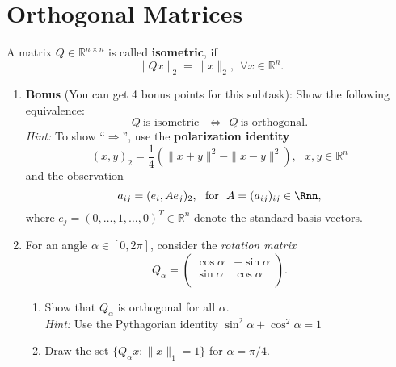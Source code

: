 \section{Orthogonal Matrices}

A matrix $Q\in\mathbb{R}^{n\times n}$ is called \textbf{isometric}, if 
$$\|Qx\|_2=\|x\|_2,  ~~\forall x\in\mathbb{R}^n.$$

\begin{enumerate}
	\item \textbf{Bonus} (You can get 4 bonus points for this subtask): Show the following equivalence:
	$$ Q   ~\text{is isometric}~~~ \Leftrightarrow~~Q~ \text{is orthogonal}.$$
	\textit{Hint:} To show ``$\Rightarrow$'', use the {\color{navy}\textbf{polarization identity}
	 $$(x,y)_2 = \frac{1}{4}\left(\|x+y\|^2 - \|x-y\|^2\right),~~~x,y \in \mathbb{R}^n $$}and the observation 
 		$$a_{ij} = (e_i, Ae_j)_2,~~ \text{for}~~A=(a_{ij})_{ij}\in\Rnn,$$
 		where $e_j=(0,\ldots, 1, \ldots, 0)^T \in \mathbb{R}^n$ denote the standard basis vectors.
	\item For an angle $\alpha \in [0,2\pi]$, consider the \textit{rotation matrix}
	$$Q_\alpha = \begin{pmatrix}
	\cos \alpha & -\sin \alpha\\
	\sin \alpha & \cos \alpha\\
	\end{pmatrix}.
	$$
	\begin{enumerate}
		\item Show that $Q_\alpha$ is orthogonal for all $\alpha$. \\
		\textit{Hint:} Use the Pythagorian identity $\sin^2\alpha + \cos^2\alpha = 1$
		\item Draw the set $\{Q_\alpha x: \|x\|_1 = 1\}$ for $\alpha = \pi/4$.
	\end{enumerate}
\end{enumerate}

